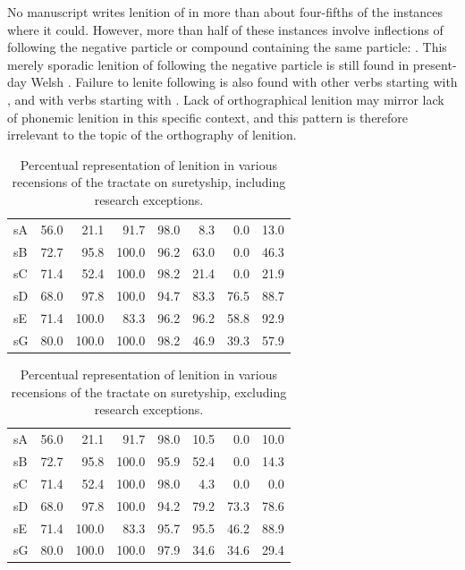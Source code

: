 No manuscript writes lenition of  in more than about four-fifths of the instances where it could. However, more than half of these instances involve inflections of  following the negative particle  or compound containing the same particle: . This merely sporadic lenition of  following the negative particle is still found in present-day Welsh \autocite[695]{thomas_gramadeg_1996}. Failure to lenite following  is also found with other verbs starting with , and with verbs starting with . Lack of orthographical lenition may mirror lack of phonemic lenition in this specific context, and this pattern is therefore irrelevant to the topic of the orthography of lenition. 


\begin{table}[h]
  \centering
    \begin{tabular}{lddddddd}
    \toprule
     &  &  &  &  &  &  &  \\
    \midrule
    \gls{sA} & 56.0 & 21.1 & 91.7 & 98.0 & 8.3 & 0.0 & 13.0 \\
    \gls{sB} & 72.7 & 95.8 & 100.0 & 96.2 & 63.0 & 0.0 & 46.3 \\
    \gls{sC} & 71.4 & 52.4 & 100.0 & 98.2 & 21.4 & 0.0 & 21.9 \\
    \gls{sD} & 68.0 & 97.8 & 100.0 & 94.7 & 83.3 & 76.5 & 88.7 \\
    \gls{sE} & 71.4 & 100.0 & 83.3 & 96.2 & 96.2 & 58.8 & 92.9 \\
    \gls{sG} & 80.0 & 100.0 & 100.0 & 98.2 & 46.9 & 39.3 & 57.9 \\
    \bottomrule
    \end{tabular}%
    \caption{Percentual representation of lenition in various recensions of the tractate on suretyship, including research exceptions.}
    \label{tab:lenlawcountryincre}%
\end{table}%


\begin{table}[h]
  \centering
    \begin{tabular}{lddddddd}
    \toprule
       &  &  &  &  &  &  &  \\
      \midrule
      \gls{sA} & 56.0 & 21.1 & 91.7 & 98.0 & 10.5 & 0.0 & 10.0 \\
      \gls{sB} & 72.7 & 95.8 & 100.0 & 95.9 & 52.4 & 0.0 & 14.3 \\
      \gls{sC} & 71.4 & 52.4 & 100.0 & 98.0 & 4.3 & 0.0 & 0.0 \\
      \gls{sD} & 68.0 & 97.8 & 100.0 & 94.2 & 79.2 & 73.3 & 78.6 \\
      \gls{sE} & 71.4 & 100.0 & 83.3 & 95.7 & 95.5 & 46.2 & 88.9 \\
      \gls{sG} & 80.0 & 100.0 & 100.0 & 97.9 & 34.6 & 34.6 & 29.4 \\
    \bottomrule
    \end{tabular}%
    \caption{Percentual representation of lenition in various recensions of the tractate on suretyship, excluding research exceptions.}
    \label{tab:lenlawcountryexcre}%
  \end{table}%

